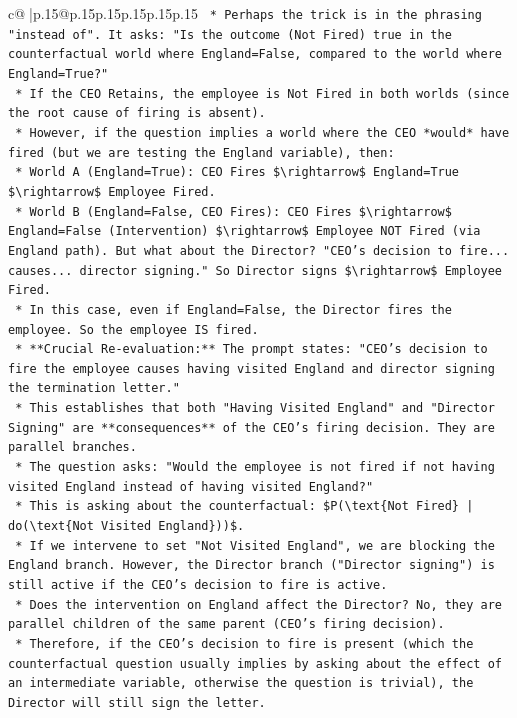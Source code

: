 \documentclass{article}
\begin{document}
{\begin{supertabular}{c@{$\;$}|p{.15\linewidth}@{}p{.15\linewidth}p{.15\linewidth}p{.15\linewidth}p{.15\linewidth}p{.15\linewidth}}
{{{\texttt{    *   Perhaps the trick is in the phrasing "instead of". It asks: "Is the outcome (Not Fired) true in the counterfactual world where England=False, compared to the world where England=True?"} \\
\texttt{    *   If the CEO Retains, the employee is Not Fired in both worlds (since the root cause of firing is absent).} \\
\texttt{    *   However, if the question implies a world where the CEO *would* have fired (but we are testing the England variable), then:} \\
\texttt{        *   World A (England=True): CEO Fires \$\textbackslash{}rightarrow\$ England=True \$\textbackslash{}rightarrow\$ Employee Fired.} \\
\texttt{        *   World B (England=False, CEO Fires): CEO Fires \$\textbackslash{}rightarrow\$ England=False (Intervention) \$\textbackslash{}rightarrow\$ Employee NOT Fired (via England path). But what about the Director? "CEO's decision to fire... causes... director signing." So Director signs \$\textbackslash{}rightarrow\$ Employee Fired.} \\
\texttt{        *   In this case, even if England=False, the Director fires the employee. So the employee IS fired.} \\
\texttt{    *   **Crucial Re{-}evaluation:** The prompt states: "CEO's decision to fire the employee causes having visited England and director signing the termination letter."} \\
\texttt{    *   This establishes that both "Having Visited England" and "Director Signing" are **consequences** of the CEO's firing decision. They are parallel branches.} \\
\texttt{    *   The question asks: "Would the employee is not fired if not having visited England instead of having visited England?"} \\
\texttt{    *   This is asking about the counterfactual: \$P(\textbackslash{}text\{Not Fired\} | do(\textbackslash{}text\{Not Visited England\}))\$.} \\
\texttt{    *   If we intervene to set "Not Visited England", we are blocking the England branch. However, the Director branch ("Director signing") is still active if the CEO's decision to fire is active.} \\
\texttt{    *   Does the intervention on England affect the Director? No, they are parallel children of the same parent (CEO's firing decision).} \\
\texttt{    *   Therefore, if the CEO's decision to fire is present (which the counterfactual question usually implies by asking about the effect of an intermediate variable, otherwise the question is trivial), the Director will still sign the letter.} \\
}}}
\end{supertabular}}
\end{document}
